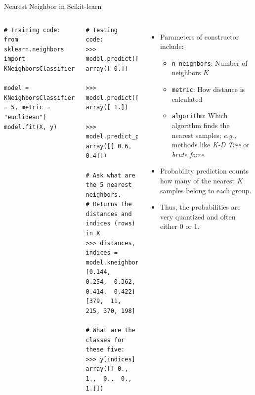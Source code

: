 \documentclass[10pt, aspectratio=169]{beamer} %
\begin{document}
\begin{frame}[fragile,allowframebreaks=0.8]
 {Nearest Neighbor in Scikit-learn}
\begin{columns}[onlytextwidth]
\begin{lstlisting}
# Training code:
from sklearn.neighbors import KNeighborsClassifier

model = KNeighborsClassifier(n_neighbors = 5, metric = "euclidean")
model.fit(X, y)
\end{lstlisting}
\begin{lstlisting}
# Testing code:
>>> model.predict([-10,-2])
array([ 0.])

>>> model.predict([1,2])
array([ 1.])

>>> model.predict_proba([0,-3])
array([[ 0.6,  0.4]])

# Ask what are the 5 nearest neighbors.
# Returns the distances and indices (rows) in X
>>> distances, indices = model.kneighbors([0,-3])
[0.144,  0.254,  0.362,  0.414,  0.422]
[379,  11, 215, 370, 198]

# What are the classes for these five:
>>> y[indices]
array([[ 0.,  1.,  0.,  0.,  1.]])
\end{lstlisting}
\begin{itemize}
\item Parameters of constructor include:
\begin{itemize}
\item \verb+n_neighbors+: Number of neighbors $K$
\item \verb+metric+: How distance is calculated
\item \verb+algorithm+: Which algorithm finds the nearest samples;
\textit{e.g.,} methods like \textit{K-D Tree} or \textit{brute force}
\end{itemize}
\item Probability prediction counts how many of the nearest $K$ samples belong
to each group.
\item Thus, the probabilities are very quantized and often either $0$ or $1$.
\end{itemize}
\end{columns}
\end{frame}
\end{document}
